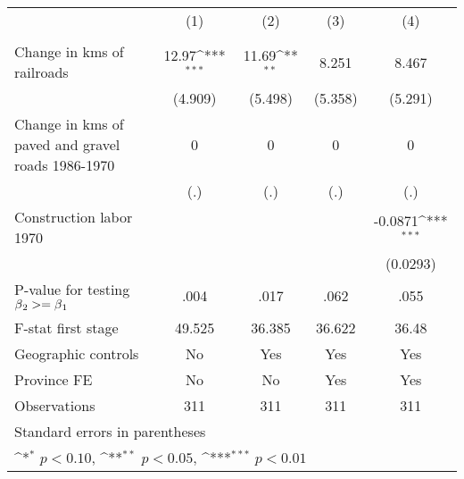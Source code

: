 {
\def\sym#1{\ifmmode^{#1}\else\(^{#1}\)\fi}
\begin{tabular}{l*{4}{c}}
\hline\hline
                &\multicolumn{1}{c}{(1)}&\multicolumn{1}{c}{(2)}&\multicolumn{1}{c}{(3)}&\multicolumn{1}{c}{(4)}\\
                &\multicolumn{1}{c}{}&\multicolumn{1}{c}{}&\multicolumn{1}{c}{}&\multicolumn{1}{c}{}\\
\hline
Change in kms of railroads&    12.97\sym{***}&    11.69\sym{**} &    8.251         &    8.467         \\
                &  (4.909)         &  (5.498)         &  (5.358)         &  (5.291)         \\
[1em]
Change in kms of paved and gravel roads 1986-1970&        0         &        0         &        0         &        0         \\
                &      (.)         &      (.)         &      (.)         &      (.)         \\
[1em]
Construction labor 1970&                  &                  &                  &  -0.0871\sym{***}\\
                &                  &                  &                  & (0.0293)         \\
\hline
P-value for testing $\beta\\_2 >= \beta\\_1$&     .004         &     .017         &     .062         &     .055         \\
F-stat first stage&   49.525         &   36.385         &   36.622         &    36.48         \\
Geographic controls&       No         &      Yes         &      Yes         &      Yes         \\
Province FE     &       No         &       No         &      Yes         &      Yes         \\
Observations    &      311         &      311         &      311         &      311         \\
\hline\hline
\multicolumn{5}{l}{\footnotesize Standard errors in parentheses}\\
\multicolumn{5}{l}{\footnotesize \sym{*} \(p<0.10\), \sym{**} \(p<0.05\), \sym{***} \(p<0.01\)}\\
\end{tabular}
}
